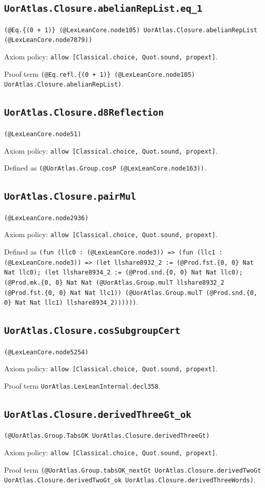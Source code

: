 \documentclass[11pt]{article}
\begin{document}
\subsection*{\texttt{UorAtlas.Closure.abelianRepList.eq\_1}}
\noindent\texttt{(@Eq.\{(0 + 1)\} (@LexLeanCore.node105) UorAtlas.Closure.abelianRepList (@LexLeanCore.node7879))}\par
\noindent Axiom policy: \texttt{allow [Classical.choice, Quot.sound, propext]}.\par
\noindent Proof term \texttt{(@Eq.refl.\{(0 + 1)\} (@LexLeanCore.node105) UorAtlas.Closure.abelianRepList)}.\par
\subsection*{\texttt{UorAtlas.Closure.d8Reflection}}
\noindent\texttt{(@LexLeanCore.node51)}\par
\noindent Axiom policy: \texttt{allow [Classical.choice, Quot.sound, propext]}.\par
\noindent Defined as \texttt{(@UorAtlas.Group.cosP (@LexLeanCore.node163))}.\par
\subsection*{\texttt{UorAtlas.Closure.pairMul}}
\noindent\texttt{(@LexLeanCore.node2936)}\par
\noindent Axiom policy: \texttt{allow [Classical.choice, Quot.sound, propext]}.\par
\noindent Defined as \texttt{(fun (llc0 : (@LexLeanCore.node3)) => (fun (llc1 : (@LexLeanCore.node3)) => (let llshare8932\_2 := (@Prod.fst.\{0, 0\} Nat Nat llc0); (let llshare8934\_2 := (@Prod.snd.\{0, 0\} Nat Nat llc0); (@Prod.mk.\{0, 0\} Nat Nat (@UorAtlas.Group.mulT llshare8932\_2 (@Prod.fst.\{0, 0\} Nat Nat llc1)) (@UorAtlas.Group.mulT (@Prod.snd.\{0, 0\} Nat Nat llc1) llshare8934\_2))))))}.\par
\subsection*{\texttt{UorAtlas.Closure.cosSubgroupCert}}
\noindent\texttt{(@LexLeanCore.node5254)}\par
\noindent Axiom policy: \texttt{allow [Classical.choice, Quot.sound, propext]}.\par
\noindent Proof term \texttt{UorAtlas.LexLeanInternal.decl358}.\par
\subsection*{\texttt{UorAtlas.Closure.derivedThreeGt\_ok}}
\noindent\texttt{(@UorAtlas.Group.TabsOK UorAtlas.Closure.derivedThreeGt)}\par
\noindent Axiom policy: \texttt{allow [Classical.choice, Quot.sound, propext]}.\par
\noindent Proof term \texttt{(@UorAtlas.Group.tabsOK\_nextGt UorAtlas.Closure.derivedTwoGt UorAtlas.Closure.derivedTwoGt\_ok UorAtlas.Closure.derivedThreeWords)}.\par
\end{document}
